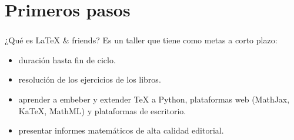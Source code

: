 \setlength{\parskip}{\baselineskip}
\section{Primeros pasos}
\begin{frame}[t]
\frametitle{\insertsection}
\begin{block}{¿Qué es \LaTeX{} \& friends?}
	Es un taller que tiene como metas a corto plazo:
	\begin{itemize}
		\item duración hasta fin de ciclo.
		\item resolución de los ejercicios de los libros.
		\item aprender a embeber y extender \TeX{} a Python, plataformas web (MathJax, Ka\TeX, MathML) y plataformas de escritorio.
		\item presentar informes matemáticos de alta calidad editorial.
	\end{itemize}
\end{block}
\end{frame}

{
	\begin{frame}[plain]
\end{frame}
}